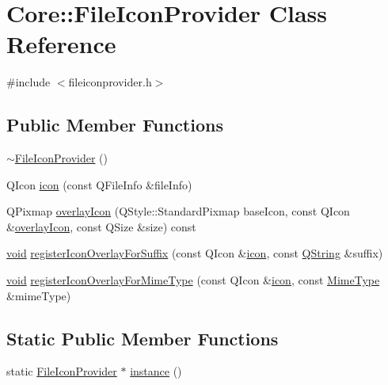 \hypertarget{class_core_1_1_file_icon_provider}{\section{\-Core\-:\-:\-File\-Icon\-Provider \-Class \-Reference}
\label{class_core_1_1_file_icon_provider}
}


{\ttfamily \#include $<$fileiconprovider.\-h$>$}

\subsection*{\-Public \-Member \-Functions}
\begin{DoxyCompactItemize}
\item 
\hyperlink{group___core_plugin_gac593ae4c8c40efedf074274bc8638ed7}{$\sim$\-File\-Icon\-Provider} ()
\item 
\-Q\-Icon \hyperlink{group___core_plugin_ga75107509c65af77e96ab0d2a9f08db73}{icon} (const \-Q\-File\-Info \&file\-Info)
\item 
\-Q\-Pixmap \hyperlink{group___core_plugin_ga58fcc29c31f6ae8b15a77a3866601df1}{overlay\-Icon} (\-Q\-Style\-::\-Standard\-Pixmap base\-Icon, const \-Q\-Icon \&\hyperlink{group___core_plugin_ga58fcc29c31f6ae8b15a77a3866601df1}{overlay\-Icon}, const \-Q\-Size \&size) const 
\item 
\hyperlink{group___u_a_v_objects_plugin_ga444cf2ff3f0ecbe028adce838d373f5c}{void} \hyperlink{group___core_plugin_ga9616ec4cd93b85ef72e1a19b150bcdf1}{register\-Icon\-Overlay\-For\-Suffix} (const \-Q\-Icon \&\hyperlink{group___core_plugin_ga75107509c65af77e96ab0d2a9f08db73}{icon}, const \hyperlink{group___u_a_v_objects_plugin_gab9d252f49c333c94a72f97ce3105a32d}{\-Q\-String} \&suffix)
\item 
\hyperlink{group___u_a_v_objects_plugin_ga444cf2ff3f0ecbe028adce838d373f5c}{void} \hyperlink{group___core_plugin_ga151216e95f03ddac45c2f705d6459070}{register\-Icon\-Overlay\-For\-Mime\-Type} (const \-Q\-Icon \&\hyperlink{group___core_plugin_ga75107509c65af77e96ab0d2a9f08db73}{icon}, const \hyperlink{class_core_1_1_mime_type}{\-Mime\-Type} \&mime\-Type)
\end{DoxyCompactItemize}
\subsection*{\-Static \-Public \-Member \-Functions}
\begin{DoxyCompactItemize}
\item 
static \hyperlink{class_core_1_1_file_icon_provider}{\-File\-Icon\-Provider} $\ast$ \hyperlink{group___core_plugin_ga55a436cb128665743dc4a3509672bfb4}{instance} ()
\end{DoxyCompactItemize}


